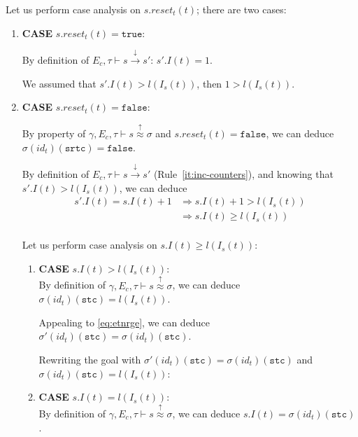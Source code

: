 \documentclass[dvipsnames,12pt]{article}
\begin{document}
\begin{niproof}
\begin{enumerate}
\begin{enumerate}
      Let us perform case analysis on $s.reset_t(t)$; there are two
      cases:
      \begin{enumerate}
      \item \textbf{CASE} $s.reset_t(t)=\mathtt{true}$:
        
        By definition of
        $E_c,\tau\vdash{}s\xrightarrow{\downarrow}s'$: $s'.I(t)=1$.

        We assumed that $s'.I(t)>l(I_s(t))$, then
        $1>l(I_s(t))$.


      \item \textbf{CASE} $s.reset_t(t)=\mathtt{false}$:
        
        By property of
        $\gamma,E_c,\tau\vdash{}s\stackrel{\uparrow}{\approx}\sigma$
        and $s.reset_t(t)=\mathtt{false}$, we can deduce
        $\sigma(id_t)(\texttt{srtc})=\mathtt{false}$.

        By definition of $E_c,\tau\vdash{}s\xrightarrow{\downarrow}s'$
        (Rule~\ref{it:inc-counters}), and knowing that
        $s'.I(t)>l(I_s(t))$, we can deduce
        \begin{equation*}
          \begin{split}
            s'.I(t)=s.I(t)+1&\Rightarrow{}s.I(t)+1>l(I_s(t))\\
            & \Rightarrow{}s.I(t)\ge{}l(I_s(t))\\
          \end{split}
        \end{equation*}

        Let us perform case analysis on $s.I(t)\ge{}l(I_s(t))$:
        \begin{enumerate}
        \item \textbf{CASE} $s.I(t)>l(I_s(t))$: \\
          By definition of
          $\gamma,E_c,\tau\vdash{}s\stackrel{\uparrow}{\approx}\sigma$,
          we can deduce $\sigma(id_t)(\texttt{stc})=l(I_s(t))$.

          Appealing to \eqref{eq:etnrge}, we can deduce
          $\sigma'(id_t)(\texttt{stc})=\sigma(id_t)(\texttt{stc})$.

          Rewriting the goal with
          $\sigma'(id_t)(\texttt{stc})=\sigma(id_t)(\texttt{stc})$ and
          $\sigma(id_t)(\texttt{stc})=l(I_s(t))$: 
          
        \item \textbf{CASE} $s.I(t)=l(I_s(t))$: \\
          By definition of
          $\gamma,E_c,\tau\vdash{}s\stackrel{\uparrow}{\approx}\sigma$,
          we can deduce $s.I(t)=\sigma(id_t)(\texttt{stc})$.


\end{enumerate}
\end{enumerate}
\end{enumerate}
\end{enumerate}
\end{niproof}
\end{document}
